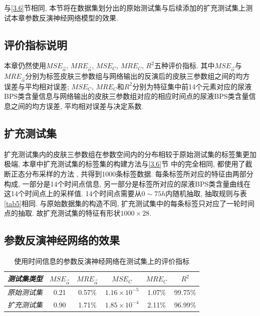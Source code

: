 \documentclass[a4paper,punct=banjiao,twoside]{ctexrep}
\theoremstyle{plain}
\theoremstyle{definition}
\theoremstyle{remark}
\begin{document}
与\ref{3.6}节相同, 本节将在数据集划分出的原始测试集与后续添加的扩充测试集上测试本章参数反演神经网络模型的效果.

\subsection*{评价指标说明}

本章仍然使用$MSE_{\vec{\alpha}}$, $MRE_{\vec{\alpha}}$, $MSE_{C}$, $MRE_{C}$, $R^2$五种评价指标. 其中$MSE_{\vec{\alpha}}$与$MRE_{\vec{\alpha}}$分别为标签皮肤三参数组与网络输出的反演后的皮肤三参数组之间的均方误差与平均相对误差; 
$MSE_{C}$, $MRE_{C}$和$R^2$分别为特征集中前14个元素对应的尿液BPS类含量信息与网络输出的皮肤三参数组对应的相应时间点的尿液BPS类含量信息之间的均方误差, 平均相对误差与决定系数.

\subsection*{扩充测试集}

扩充测试集内的皮肤三参数组在参数空间内的分布相较于原始测试集的标签集更加极端, 本章中扩充测试集的标签集的构建方法与\ref{3.6}节
中的完全相同, 都使用了截断正态分布采样的方法 , 共得到1000条标签数据. 
每条标签所对应的特征由两部分构成, 一部分是14个时间点信息, 另一部分是标签所对应的尿液BPS类含量曲线在这14个时间点上的采样值.
14个时间点需要从$0\sim75h$内随机抽取, 抽取规则与表\ref{tab5}相同. 与原始数据集的构造不同, 扩充测试集中的每条标签只对应了一轮时间点的抽取. 故扩充测试集的特征有形状$1000\times 28$.

\subsection*{参数反演神经网络的效果}

\begin{table}[htbp]
  \centering
  \begin{tabular}[t]{l*{5}{c}}
    \hline
    \textit{测试集类型} &$MSE_{\vec{\alpha}}$&$MRE_{\vec{\alpha}}$ & $MSE_{C}$& $MRE_{C}$& $R^2$\\
    \hline
    \textit{原始测试集} &  0.21  &   0.57\%     &   $1.16\times 10^{-5}$     &  1.07\%     &  99.75\%  \\ 
    \textit{扩充测试集} &  0.90  &   1.71\%     &   $1.85\times 10^{-4}$     &  2.11\%     & 96.99\%  \\ 
    \hline
  \end{tabular}
  \caption{\label{tab7}使用时间信息的参数反演神经网络在测试集上的评价指标} 
\end{table}  
\end{document}
